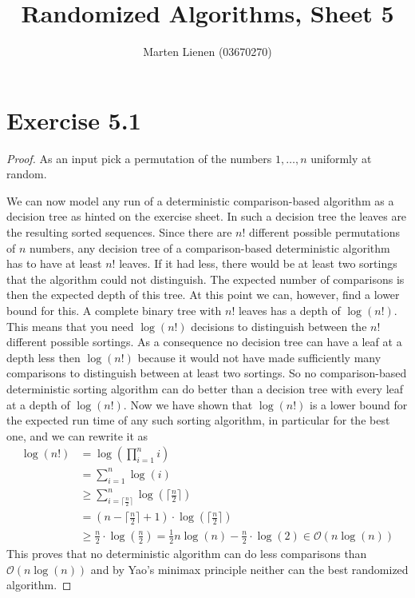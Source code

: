 \documentclass[10pt,a4paper]{article}
\title{Randomized Algorithms, Sheet 5}
\author{Marten Lienen (03670270)}
\begin{document}
\maketitle

\section*{Exercise 5.1}

\begin{proof}
  As an input pick a permutation of the numbers $1, \dots, n$ uniformly at random.

  We can now model any run of a deterministic comparison-based algorithm as a decision tree as hinted on the exercise sheet.
  In such a decision tree the leaves are the resulting sorted sequences.
  Since there are $n!$ different possible permutations of $n$ numbers, any decision tree of a comparison-based deterministic algorithm has to have at least $n!$ leaves.
  If it had less, there would be at least two sortings that the algorithm could not distinguish.
  The expected number of comparisons is then the expected depth of this tree.
  At this point we can, however, find a lower bound for this.
  A complete binary tree with $n!$ leaves has a depth of $\log(n!)$.
  This means that you need $\log(n!)$ decisions to distinguish between the $n!$ different possible sortings.
  As a consequence no decision tree can have a leaf at a depth less then $\log(n!)$ because it would not have made sufficiently many comparisons to distinguish between at least two sortings.
  So no comparison-based deterministic sorting algorithm can do better than a decision tree with every leaf at a depth of $\log(n!)$.
  Now we have shown that $\log(n!)$ is a lower bound for the expected run time of any such sorting algorithm, in particular for the best one, and we can rewrite it as
  \begin{align*}
    \log(n!) & = \log\left( \prod_{i = 1}^{n} i \right)\\
             & = \sum_{i = 1}^{n} \log(i)\\
             & \ge \sum_{i = \lceil \frac{n}{2} \rceil}^{n} \log\left( \lceil \frac{n}{2} \rceil \right)\\
             & = \left( n - \lceil \frac{n}{2} \rceil + 1 \right) \cdot \log\left( \lceil \frac{n}{2} \rceil \right)\\
             & \ge \frac{n}{2} \cdot \log\left( \frac{n}{2} \right) = \frac{1}{2}n \log(n) - \frac{n}{2} \cdot \log(2) \in \mathcal{O}(n\log(n))
  \end{align*}
  This proves that no deterministic algorithm can do less comparisons than $\mathcal{O}(n\log(n))$ and by Yao's minimax principle neither can the best randomized algorithm.
\end{proof}
\end{document}
